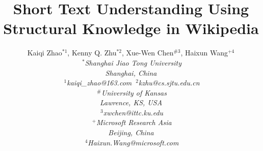 \documentclass[10pt,conference,letterpaper]{IEEEtran}
\begin{document}
\title{Short Text Understanding Using Structural Knowledge in Wikipedia}
\author{
{Kaiqi Zhao{\small $^{* 1}$}, Kenny Q. Zhu{\small $^{* 2}$}, 
Xue-Wen Chen{\small $^{\# 3}$}, Haixun Wang{\small $^{+ 4}$} }%
\vspace{1.6mm}\\
\fontsize{10}{10}\selectfont\itshape
$~^*$Shanghai Jiao Tong University\\
Shanghai, China\\
\fontsize{9}{9}\selectfont\ttfamily\upshape
$~^{1}$kaiqi\_zhao@163.com $~^{2}$kzhu@cs.sjtu.edu.cn%
\vspace{1.2mm}\\
\fontsize{10}{10}\selectfont\rmfamily\itshape
$~^\#$University of Kansas\\
Lawrence, KS, USA\\
\fontsize{9}{9}\selectfont\ttfamily\upshape
$~^{3}$xwchen@ittc.ku.edu%
\vspace{1.2mm}\\
\fontsize{10}{10}\selectfont\rmfamily\itshape
$~^+$Microsoft Research Asia\\
Beijing, China\\
\fontsize{9}{9}\selectfont\ttfamily\upshape
$~^{4}$Haixun.Wang@microsoft.com
}
%

\maketitle
%
\end{document}
